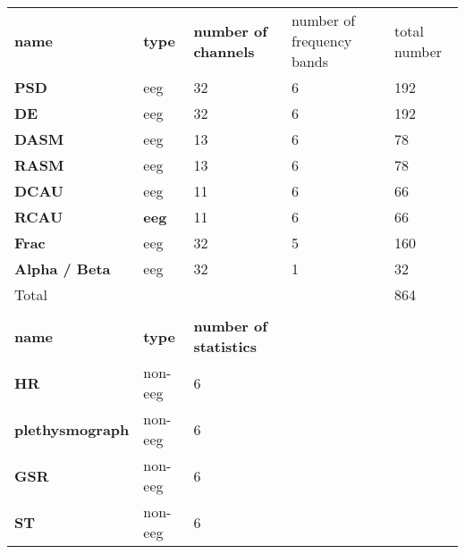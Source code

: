 \begin{table}[]
\centering
\begin{tabular}{lllll}
\textbf{name}           & \textbf{type} & \textbf{number of channels}   & number of frequency bands & total number \\
\textbf{PSD}            & eeg           & 32                            & 6                         & 192          \\
\textbf{DE}             & eeg           & 32                            & 6                         & 192          \\
\textbf{DASM}           & eeg           & 13                            & 6                         & 78           \\
\textbf{RASM}           & eeg           & 13                            & 6                         & 78           \\
\textbf{DCAU}           & eeg           & 11                            & 6                         & 66           \\
\textbf{RCAU}           & \textbf{eeg}  & 11                            & 6                         & 66           \\
\textbf{Frac}           & eeg           & 32                            & 5                         & 160          \\
\textbf{Alpha / Beta}   & eeg           & 32                            & 1                         & 32           \\
Total                   &               &                               &                           & 864          \\
                        &               &                               &                           &              \\
\textbf{name}           & \textbf{type} & \textbf{number of statistics} &                           &              \\
\textbf{HR}             & non-eeg       & 6                             &                           &              \\
\textbf{plethysmograph} & non-eeg       & 6                             &                           &              \\
\textbf{GSR}            & non-eeg       & 6                             &                           &              \\
\textbf{ST}             & non-eeg       & 6                             &                           &              \\

\end{tabular}
\end{table}
